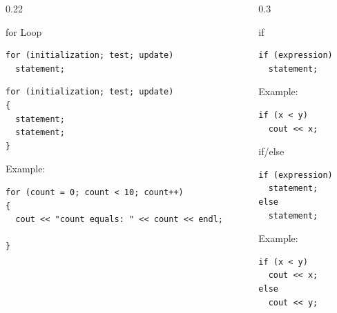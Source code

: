 \documentclass[final]{beamer}
\begin{document}
\begin{frame}[t,fragile]
\begin{columns}[t,totalwidth=0.95\paperwidth, colsep=0.05\paperwidth]
\begin{column}{0.22\paperwidth}
\begin{block}{\raggedright for Loop}

\begin{lstlisting}
for (initialization; test; update)
  statement;
\end{lstlisting}

\begin{lstlisting}
for (initialization; test; update)
{
  statement;
  statement;
}
\end{lstlisting}


Example:

\begin{lstlisting}
for (count = 0; count < 10; count++)
{
  cout << "count equals: " << count << endl;
  
}
\end{lstlisting}


\end{block}



\end{column}
\begin{column}{0.3\paperwidth}




\begin{block}{\raggedright if}
\begin{lstlisting}
if (expression)
  statement;
\end{lstlisting}
Example:
\begin{lstlisting}
if (x < y)
  cout << x;
\end{lstlisting}
\end{block}

\begin{block}{\raggedright if/else}
\begin{lstlisting}
if (expression)
  statement;
else
  statement;
\end{lstlisting}
Example:
\begin{lstlisting}
if (x < y)
  cout << x;
else
  cout << y;
\end{lstlisting}
\end{block}


\end{column}
\end{columns}
\end{frame}
\end{document}
